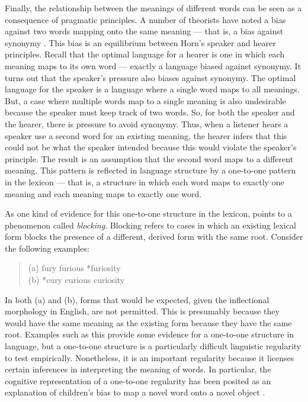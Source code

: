 \documentclass[man]{apa2}
\begin{document}
Finally, the relationship between the meanings of different words can be seen as a consequence of pragmatic principles. A number of theorists have noted a bias against two words mapping onto the same meaning --- that is, a bias against synonymy \cite{saussure, kiparsky1983word, horn1984, clark1987principle, clark1988logic}. This bias is an equilibrium between Horn's speaker and hearer principles. Recall that the optimal language for a hearer is one in which each meaning maps to its own word --- exactly a language biased against synonymy. It turns out that the speaker's pressure also biases against synonymy.  The optimal language for the speaker is a language where a single word maps to all meanings. But, a case where multiple words map to a single meaning is also undesirable because the speaker must keep track of two words. So, for both the speaker and the hearer, there is pressure to avoid synonymy. Thus, when a listener hears a speaker use a second word for an existing meaning, the hearer infers that this could not be what the speaker intended because this would violate the speaker's principle. The result is an assumption that the second word maps to a different meaning. This pattern is reflected in language structure by a one-to-one pattern in the lexicon --- that is, a structure in which each word maps to exactly one meaning and each meaning maps to exactly one word.

As one kind of evidence for this one-to-one structure in the lexicon,  points to a phenomenon called {\it blocking}. Blocking refers to cases in which an existing lexical form blocks the presence of a different, derived form with the same root. Consider the following examples:
 \begin{quote} 
 	(a) fury furious *furiosity\\
	(b) *cury curious curiosity 
\end{quote}
In both (a) and (b), forms that would be expected, given the inflectional morphology in English, are not permitted. This is presumably because they would have the same meaning as the existing form because they have the same root. Examples such as this provide some evidence for a one-to-one structure in language, but a one-to-one structure is a particularly difficult linguistic regularity to test empirically. Nonetheless, it is an important regularity because it licenses certain inferences in interpreting the meaning of words. In particular, the cognitive representation of a one-to-one regularity has been posited as an explanation of children's bias to map a novel word onto a novel object \cite{markman1988, markman2003}.
\end{document}
